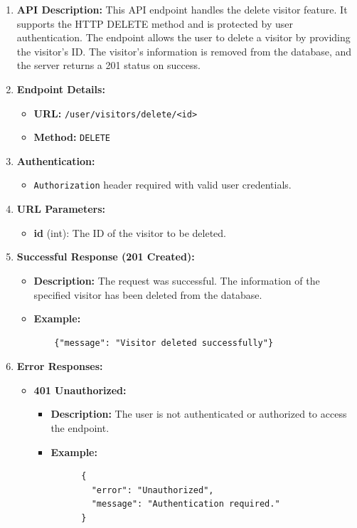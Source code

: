 \documentclass[a4 paper, 12pt]{article}
\begin{document}
\begin{enumerate}
  \item \textbf{API Description:} This API endpoint handles the delete visitor feature. It supports the HTTP DELETE method and is protected by user authentication. The endpoint allows the user to delete a visitor by providing the visitor's ID. The visitor's information is removed from the database, and the server returns a 201 status on success.

  \item \textbf{Endpoint Details:}
  \begin{itemize}
    \item \textbf{URL:} \texttt{/user/visitors/delete/<id>}
    \item \textbf{Method:} \texttt{DELETE}
  \end{itemize}

  \item \textbf{Authentication:}
  \begin{itemize}
    \item \texttt{Authorization} header required with valid user credentials.
  \end{itemize}

  \item \textbf{URL Parameters:}
  \begin{itemize}
    \item \textbf{id} (int): The ID of the visitor to be deleted.
  \end{itemize}

  \item \textbf{Successful Response (201 Created):}
  \begin{itemize}
    \item \textbf{Description:} The request was successful. The information of the specified visitor has been deleted from the database.
    \item \textbf{Example:}
    \begin{verbatim}
    {"message": "Visitor deleted successfully"}
    \end{verbatim}
  \end{itemize}

  \item \textbf{Error Responses:}
  \begin{itemize}
    \item \textbf{401 Unauthorized:}
    \begin{itemize}
      \item \textbf{Description:} The user is not authenticated or authorized to access the endpoint.
      \item \textbf{Example:}
      \begin{verbatim}
      {
        "error": "Unauthorized",
        "message": "Authentication required."
      }
      \end{verbatim}
    \end{itemize}
  \end{itemize}
\end{enumerate}
\end{document}

